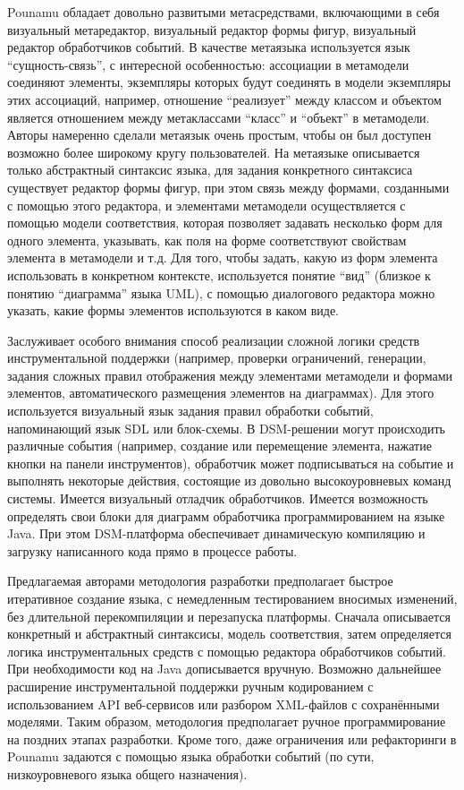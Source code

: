 Pounamu обладает довольно развитыми метасредствами, включающими в себя визуальный 
метаредактор, визуальный редактор формы фигур, визуальный редактор обработчиков событий. 
В качестве метаязыка используется язык "`сущность-связь"', с интересной особенностью: 
ассоциации в метамодели соединяют элементы, экземпляры которых будут соединять в модели 
экземпляры этих ассоциаций, например, отношение “реализует” между классом и объектом 
является отношением между метаклассами "`класс"' и "`объект"' в метамодели. Авторы 
намеренно сделали метаязык очень простым, чтобы он был доступен возможно более широкому 
кругу пользователей. На метаязыке описывается только абстрактный синтаксис языка, для 
задания конкретного синтаксиса существует редактор формы фигур, при этом связь между 
формами, созданными с помощью этого редактора, и элементами метамодели осуществляется 
с помощью модели соответствия, которая позволяет задавать несколько форм для одного 
элемента, указывать, как поля на форме соответствуют свойствам элемента в метамодели 
и т.д. Для того, чтобы задать, какую из форм элемента использовать в конкретном контексте, 
используется понятие "`вид"' (близкое к понятию "`диаграмма"' языка UML), с помощью 
диалогового редактора можно указать, какие формы элементов используются в каком виде.

Заслуживает особого внимания способ реализации сложной логики средств инструментальной 
поддержки (например, проверки ограничений, генерации, задания сложных правил отображения 
между элементами метамодели и формами элементов, автоматического размещения элементов 
на диаграммах). Для этого используется визуальный язык задания правил обработки событий, 
напоминающий язык SDL или блок-схемы. В DSM-решении могут происходить различные события 
(например, создание или перемещение элемента, нажатие кнопки на панели инструментов), 
обработчик может подписываться на событие и выполнять некоторые действия, состоящие из 
довольно высокоуровневых команд системы. Имеется визуальный отладчик обработчиков. 
Имеется возможность определять свои блоки для диаграмм обработчика программированием 
на языке Java. При этом DSM-платформа обеспечивает динамическую компиляцию и загрузку 
написанного кода прямо в процессе работы.

Предлагаемая авторами методология разработки предполагает быстрое итеративное создание 
языка, с немедленным тестированием вносимых изменений, без длительной перекомпиляции 
и перезапуска платформы. Сначала описывается конкретный и абстрактный синтаксисы, 
модель соответствия, затем определяется логика инструментальных средств с помощью 
редактора обработчиков событий. При необходимости код на Java дописывается вручную. 
Возможно дальнейшее расширение инструментальной поддержки ручным кодированием с использованием 
API веб-сервисов или разбором XML-файлов с сохранёнными моделями. Таким образом, методология 
предполагает ручное программирование на поздних этапах разработки. Кроме того, даже 
ограничения или рефакторинги в Pounamu задаются с помощью языка обработки событий 
(по сути, низкоуровневого языка общего назначения).

